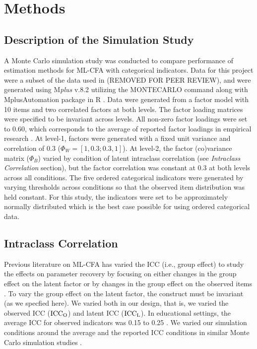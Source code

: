 \documentclass[Review,sageh,times, doublespace]{sagej}
\begin{document}
\section{Methods}

\subsection{Description of the Simulation Study}
A Monte Carlo simulation study was conducted to compare performance of estimation methods for ML-CFA with categorical indicators.
Data for this project were a subset of the data used in (REMOVED FOR PEER REVIEW), and were generated using M\textit{plus} v.8.2 \citep{Muthen2017} utilizing the MONTECARLO command along with MplusAutomation \citep{Hallquist2018} package in R \citep{R2018}. %
Data were generated from a factor model with 10 items and two correlated factors at both levels.
The factor loading matrices were specified to be invariant across levels.
All non-zero factor loadings were set to 0.60, which corresponds to the average of reported factor loadings in empirical research \citep{DiStefano2005}.
At level-1, factors were generated with a fixed unit variance and correlation of 0.3 ($\Phi_W = [1, 0.3; 0.3, 1]$).
At level-2, the factor (co)variance matrix ($\Phi_B$) varied by condition of latent intraclass correlation (see \textit{Intraclass Correlation} section), but the factor correlation was constant at 0.3 at both levels across all conditions. 
The five ordered categorical indicators were generated by varying thresholds across conditions so that the observed item distribution was held constant.
For this study, the indicators were set to be approximately normally distributed which is the best case possible for using ordered categorical data.

\subsection{Intraclass Correlation}
Previous literature on ML-CFA has varied the ICC (i.e., group effect) to study the effects on parameter recovery by focusing on either changes in the group effect on the latent factor \citep{Hox2001, Wu2012} or by changes in the group effect on the observed items \citep{Hsu2015}.
To vary the group effect on the latent factor, the construct must be invariant (as we specfied here).
We varied both in our design, that is, we varied the observed ICC ($\rm ICC_O$) and latent ICC ($\rm ICC_L$).
In educational settings, the average ICC for observed indicators was 0.15 to 0.25 \citep{Hedges2007}.
We varied our simulation conditions around the average and the reported ICC conditions in similar Monte Carlo simulation studies \citep{Navruz2016, Hsu2015, Ryu2009}.
\end{document}
